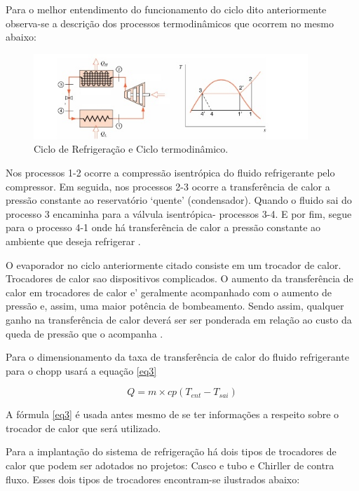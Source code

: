 			Para o melhor entendimento do funcionamento do ciclo dito anteriormente observa-se a descrição dos processos termodinâmicos que ocorrem no mesmo abaixo: 

			\begin{figure}[H]
				\centering
				\includegraphics[scale= 0.7]{figuras/ciclo-termodinamico.png}
				\caption{Ciclo de Refrigeração e Ciclo termodinâmico.}
				\label{ciclo-termodinamico}
			\end{figure}				

			Nos processos 1-2 ocorre a compressão isentrópica do fluido refrigerante pelo compressor. Em seguida, nos processos 2-3 ocorre a transferência de calor a pressão constante ao reservatório ‘quente’ (condensador). Quando o fluido sai do processo 3 encaminha para a válvula isentrópica- processos 3-4. E por fim, segue para o processo 4-1 onde há transferência de calor a pressão constante ao ambiente que deseja refrigerar \cite{boles}.

			O evaporador no ciclo anteriormente citado consiste em um trocador de calor. Trocadores de calor sao dispositivos complicados. O aumento da transferência de calor em trocadores de calor e’ geralmente acompanhado com o aumento de pressão e, assim, uma maior potência de bombeamento. Sendo assim, qualquer ganho na transferência de calor deverá ser ser ponderada em relação ao custo da queda de pressão que o acompanha \cite{boles}.  

			Para o dimensionamento da taxa de transferência de calor do fluido refrigerante para o chopp usará a equação \ref{eq3}

				\begin{equation} 
					\label{eq3}
					Q = m \times {cp(T_{ent} - T_{sai})}
				\end{equation}

			A fórmula \ref{eq3} é usada antes mesmo de se ter informações a respeito sobre o trocador de calor que será utilizado.
			
			Para a implantação do sistema de refrigeração há dois tipos de trocadores de calor que podem ser adotados no projetos: Casco e tubo e Chirller de contra fluxo. Esses dois tipos de trocadores encontram-se ilustrados abaixo: 

